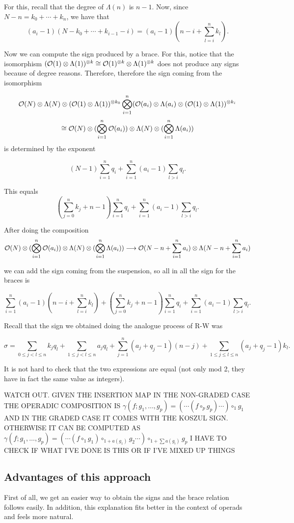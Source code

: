 \documentclass[twoside]{article}
\begin{document}
For this, recall that the degree of $\Lambda(n)$ is $n-1$. Now, since $N-n=k_0+\cdots+k_n$, we have that
$$(a_i-1)(N-k_0+\cdots+k_{i-1}-i)=(a_i-1)(n-i+\sum_{l=i}^nk_l).$$

Now we can compute the sign produced by a brace. For this, notice that the isomorphism $({\mathcal O}(1)\otimes \Lambda(1))^{\otimes k}\cong {\mathcal O}(1)^{\otimes k}\otimes \Lambda(1)^{\otimes k}$ does not produce any signs because of degree reasons. Therefore, therefore the sign coming from the isomorphism

$${\mathcal O}(N)\otimes\Lambda(N)\otimes ({\mathcal O}(1)\otimes \Lambda(1))^{\otimes k_0}\bigotimes_{i=1}^n({\mathcal O}(a_i)\otimes\Lambda(a_i)\otimes({\mathcal O}(1)\otimes\Lambda(1))^{\otimes k_i}$$
$$\cong {\mathcal O}(N)\otimes(\bigotimes_{i=1}^n {\mathcal O}(a_i))\otimes \Lambda(N)\otimes(\bigotimes_{i=1}^n \Lambda(a_i))$$
is determined by the exponent

$$(N-1)\sum_{i=1}^nq_i+\sum_{i=1}^n (a_i-1)\sum_{l>i}q_l.$$

This equals
$$(\sum_{j=0}^nk_j +n-1)\sum_{i=1}^nq_i+\sum_{i=1}^n (a_i-1)\sum_{l>i}q_l.$$

After doing the composition 
$${\mathcal O}(N)\otimes(\bigotimes_{i=1}^n {\mathcal O}(a_i))\otimes \Lambda(N)\otimes(\bigotimes_{i=1}^n \Lambda(a_i))\longrightarrow {\mathcal O}(N-n+\sum_{i=1}^na_i)\otimes \Lambda(N-n+\sum_{i=1}^na_i)$$

we can add the sign coming from the suspension, so all in all the sign for the braces is

$$\sum_{i=1}^n(a_i-1)(n-i+\sum_{l=i}^nk_l)+(\sum_{j=0}^nk_j +n-1)\sum_{i=1}^nq_i+\sum_{i=1}^n (a_i-1)\sum_{l>i}q_l.$$

Recall that the sign we obtained doing the analogue process of R-W was 

$$\sigma=\sum_{0\leq j<l\leq n}k_jq_l+\sum_{1\leq j<l\leq n}a_jq_l+\sum_{j=1}^n (a_j+q_j-1)(n-j)+\sum_{1\leq j\leq l\leq n} (a_j+q_j-1)k_l.$$

It is not hard to check that the two expressions are equal (not only mod 2, they have in fact the same value as integers).

WATCH OUT. GIVEN THE INSERTION MAP IN THE NON-GRADED CASE THE OPERADIC COMPOSITION IS $\gamma(f;g_1,\dots, g_p)=(\cdots(f\circ_p g_p)\cdots)\circ_1 g_1$ AND IN THE GRADED CASE IT COMES WITH THE KOSZUL SIGN. OTHERWISE IT CAN BE COMPUTED AS 
$\gamma(f;g_1,\dots, g_p)=(\cdots(f\circ_1 g_1)\circ_{1+a(g_1)}g_2\cdots)\circ_{1+\sum a(g_i)}g_p$ I HAVE TO CHECK IF WHAT I'VE DONE IS THIS OR IF I'VE MIXED UP THINGS

\subsection{Advantages of this approach}
First of all, we get an easier way to obtain the signs and the brace relation follows easily. In addition, this explanation fits better in the context of operads and feels more natural.
\end{document}

